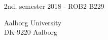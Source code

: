 \begin{titlepage}
\begin{tabular}{@{}p{\textwidth}@{}}
    \vspace{0.2cm}\\
    \midrule
    \toprule[2pt]
  \end{tabular}
  \vspace{4 cm}
  \begin{center}
    {\large
      2nd. semester 2018 - ROB2 B229%
    }\\
    \vspace{0.2cm}
    {\Large
    }
  \end{center}
  \vfill
  \begin{center}
  Aalborg University\\
  DK-9220 Aalborg
  \end{center}
\end{titlepage}
\clearpage
